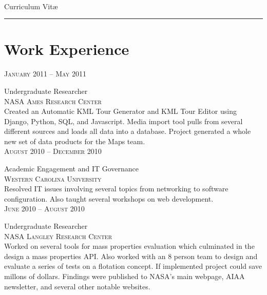 \documentclass[10pt]{article}
\begin{document}
\color{text1} %
     \par{\\
      \color{headings} Curriculum 
      {Vit\ae}\\[25pt]\par
      {\color{white} \hrule}} %

\begin{minipage}[t]{0.5\textwidth}

\vspace{0pt}   %

\section{Work Experience}
   \raggedleft
   \textsc{\normalsize January 2011 -- May 2011}\par
   \raggedright\large Undergraduate Researcher\\
   \textsc{NASA Ames Research Center}\\
   \normalsize{Created an Automatic KML Tour Generator and KML Tour 
   Editor using Django, Python, SQL, and Javascript. Media import tool
   pulls from several different sources and loads all data into a 
   database. Project generated a whole new set of data products for
   the Maps team.}\\[5pt]

   \raggedleft
   \textsc{\normalsize August 2010 -- December 2010}\par
   \raggedright\large Academic Engagement and IT Governance\\
   \textsc{Western Carolina University}\\
   \normalsize{Resolved IT issues involving several topics from 
   networking to software configuration. Also taught several 
   workshops on web development.}\\[5pt]

   \raggedleft
   \textsc{\normalsize June 2010 -- August 2010}\par
   \raggedright\large Undergraduate Researcher\\
   \textsc{NASA Langley Research Center}\\
   \normalsize{Worked on several tools for mass properties evaluation
   which culminated in the design a mass properties API. Also worked
   with an 8 person team to design and evaluate a series of tests on
   a flotation concept. If implemented project could save millons of
   dollars. Findings were published to NASA's main webpage, AIAA 
   newsletter, and several other notable websites.}\\[5pt]


\end{minipage}
\end{document}
